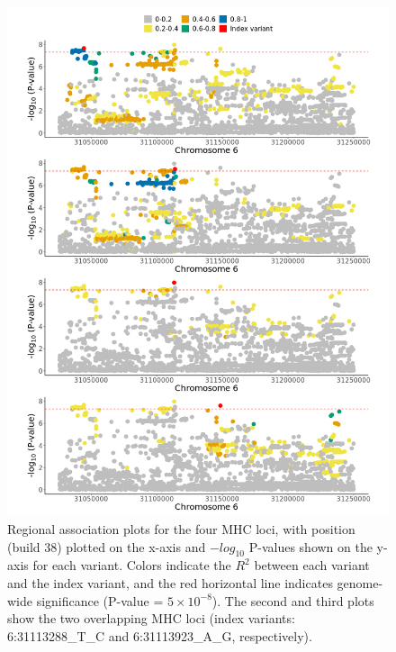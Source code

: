       \begin{figure}[H] 
        \centering    
        \includegraphics[width=1.0\textwidth]{Vector/ukbb_mhc_regional_assoc_plots.png}
        \caption[Figure]{Regional association plots for the four MHC loci, with position (build 38) plotted on the x-axis and $-log_{10}$ P-values shown on the y-axis for each variant. Colors indicate the $R^{2}$ between each variant and the index variant, and the red horizontal line indicates genome-wide significance (P-value = $5\times10^{-8}$). The second and third plots show the two overlapping MHC loci (index variants: 6:31113288\_T\_C and 6:31113923\_A\_G, respectively).}
        \label{fig:ukbb_mhc_regional_assoc_plots}
        \end{figure}

